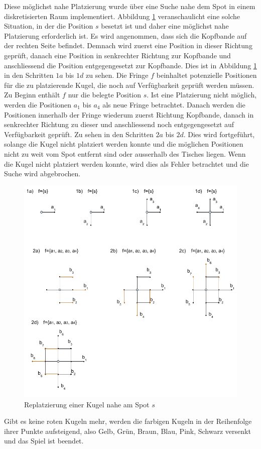 Diese möglichst nahe Platzierung wurde über eine Suche nahe dem Spot in einem diskretisierten Raum implementiert.
Abbildung \ref{fig:snooker_spot_replacement} veranschaulicht eine solche Situation, in der die Position $s$ besetzt
ist und daher eine möglichst nahe Platzierung erforderlich ist.
Es wird angenommen, dass sich die Kopfbande auf der rechten Seite befindet. Demnach wird zuerst eine Position in dieser
Richtung geprüft, danach eine Position in senkrechter Richtung zur Kopfbande und anschliessend die Position entgegengesetzt
zur Kopfbande.
Dies ist in Abbildung \ref{fig:snooker_spot_replacement} in den Schritten $1a$ bis $1d$ zu sehen.
Die Fringe $f$ beinhaltet potenzielle Positionen für die zu platzierende Kugel, die noch auf Verfügbarkeit geprüft werden müssen.
Zu Beginn enthält $f$ nur die belegte Position $s$.
Ist eine Platzierung nicht möglich, werden die Positionen $a_1$ bis $a_4$ als neue Fringe betrachtet. Danach werden die Positionen
innerhalb der Fringe wiederum zuerst Richtung Kopfbande, danach in senkrechter Richtung zu dieser und anschliessend noch entgegengesetzt
auf Verfügbarkeit geprüft. Zu sehen in den Schritten $2a$ bis $2d$. Dies wird fortgeführt, solange die Kugel nicht platziert
werden konnte und die möglichen Positionen nicht zu weit vom Spot entfernt sind oder ausserhalb des Tisches liegen.
Wenn die Kugel nicht platziert werden konnte, wird dies als Fehler betrachtet und die Suche wird abgebrochen.

\begin{figure}[h!]
    \begin{center}
        \includegraphics[width=0.6\linewidth]{../common/03_billiard_ai/resources/40_replatzierung_kugel.png}
    \end{center}
    \caption{Replatzierung einer Kugel nahe am Spot $s$}
    \label{fig:snooker_spot_replacement}
\end{figure}

Gibt es keine roten Kugeln mehr, werden die farbigen Kugeln in der Reihenfolge ihrer Punkte aufsteigend,
also Gelb, Grün, Braun, Blau, Pink, Schwarz versenkt und das Spiel ist beendet\cite{stoppball:spielregel:snooker}.
